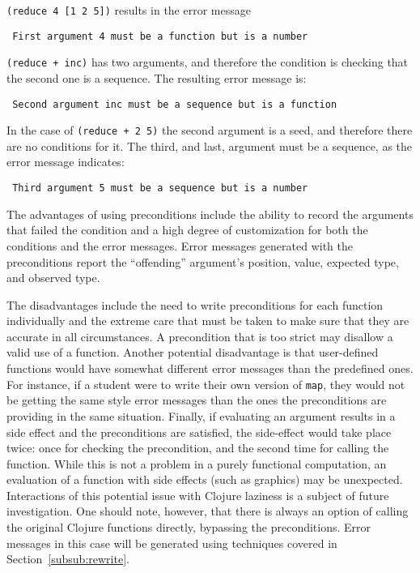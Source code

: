 \documentclass[submission,copyright,creativecommons]{eptcs}
\newcommand{\clocode}[1]{{\tt {#1}}}
\begin{document}
\clocode{(reduce 4 [1 2 5])} results in the error message

{\tt
First argument 4 must be a function but is a number
}

\clocode{(reduce + inc)} has two arguments, and therefore the condition is checking that the second one is a sequence. The resulting error message is:

{\tt
Second argument inc must be a sequence but is a function
}

In the case of \clocode{(reduce + 2 5)} the second argument is a seed, and therefore there are no conditions for it. The third, and last, argument must be a sequence, as the error message indicates:

{\tt
 Third argument 5 must be a sequence but is a number
}

The advantages of using preconditions include the ability to record the arguments that failed the condition and a high degree of customization for both the conditions and the error messages. Error messages generated with the preconditions report the ``offending'' argument's position, value, expected type, and observed type. 

The disadvantages include the need to write preconditions for each function individually and the extreme care that must be taken to make sure that they are accurate in all circumstances. A precondition that is too strict may disallow a valid use of a function. Another potential disadvantage is that user-defined functions would have somewhat different error messages than the predefined ones. For instance, if a student were to write their own version of \clocode{map}, they would not be getting the same style error messages than the ones the preconditions are providing in the same situation. Finally, if evaluating an argument results in a side effect and the preconditions are satisfied, the side-effect would take place twice: once for checking the precondition, and the second time for calling the function. While this is not a problem in a purely functional computation, an evaluation of a function with side effects (such as graphics) may be unexpected. Interactions of this potential issue with Clojure laziness is a subject of future investigation. One should note, however, that there is always an option of calling the original Clojure functions directly, bypassing the preconditions. Error messages in this case will be generated using techniques covered in Section~\ref{subsub:rewrite}. 
\end{document}
